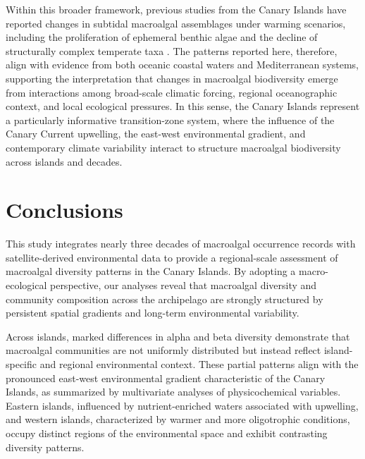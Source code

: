 \documentclass[a4paper,fleqn]{cas-sc}
\begin{document}
Within this broader framework, previous studies from the Canary Islands have reported changes in subtidal macroalgal assemblages under warming scenarios, including the proliferation of ephemeral benthic algae and the decline of structurally complex temperate taxa \cite{SANGIL2012, RIERA2015, Valdazoetal2017}. The patterns reported here, therefore, align with evidence from both oceanic coastal waters and Mediterranean systems, supporting the interpretation that changes in macroalgal biodiversity emerge from interactions among broad-scale climatic forcing, regional oceanographic context, and local ecological pressures. In this sense, the Canary Islands represent a particularly informative transition-zone system, where the influence of the Canary Current upwelling, the east-west environmental gradient, and contemporary climate variability interact to structure macroalgal biodiversity across islands and decades. 

\section{Conclusions}

This study integrates nearly three decades of macroalgal occurrence records with satellite-derived environmental data to provide a regional-scale assessment of macroalgal diversity patterns in the Canary Islands. By adopting a macro-ecological perspective, our analyses reveal that macroalgal diversity and community composition across the archipelago are strongly structured by persistent spatial gradients and long-term environmental variability. 

Across islands, marked differences in alpha and beta diversity demonstrate that macroalgal communities are not uniformly distributed but instead reflect island-specific and regional environmental context. These partial patterns align with the pronounced east-west environmental gradient characteristic of the Canary Islands, as summarized by multivariate analyses of physicochemical variables. Eastern islands, influenced by nutrient-enriched waters associated with upwelling, and western islands, characterized by warmer and more oligotrophic conditions, occupy distinct regions of the environmental space and exhibit contrasting diversity patterns.
\end{document}
